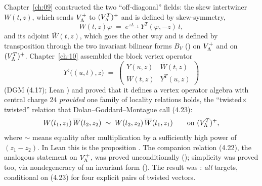 Chapter~\ref{ch:09} constructed the two ``off-diagonal'' fields: the skew intertwiner $W(t,z)$,
which sends $V_{\Lambda}^+$ to $(V_{\Lambda}^T)^+$ and is defined by skew-symmetry,
\begin{equation*}
  W(t,z)\varphi \;=\; e^{zL_{-1}}\,Y^{T}(\varphi,-z)\,t,
\end{equation*}
and its adjoint $\overline W(t,z)$, which goes the other way and is defined by transposition
through the two invariant bilinear forms $B_V$ () on $V_{\Lambda}^+$ and
 on $(V_{\Lambda}^T)^+$.  Chapter~\ref{ch:10} assembled the block vertex operator
\begin{equation}\label{ch14:eq:block}
  Y^{\natural}\bigl((u,t),z\bigr) \;=\;
  \begin{pmatrix} Y(u,z) & \overline W(t,z)\\ W(t,z) & Y^{T}(u,z)\end{pmatrix}
\end{equation}
(DGM (4.17); Lean ) and proved that it defines a vertex operator algebra with
central charge $24$ \emph{provided} one family of locality relations holds, the
``twisted$\times$twisted'' relation that Dolan--Goddard--Montague call (4.23):
\begin{equation}\label{ch14:eq:423}
  W(t_1,z_1)\,\overline W(t_2,z_2)\;\sim\;W(t_2,z_2)\,\overline W(t_1,z_1)
  \qquad\text{on }(V_{\Lambda}^{T})^{+},
\end{equation}
where $\sim$ means equality after multiplication by a sufficiently high power of $(z_1-z_2)$.
In Lean this is the proposition .  The companion relation
(4.22), the analogous statement on $V_{\Lambda}^+$, was proved unconditionally
(); simplicity was proved too, via nondegeneracy of an invariant form
().  The result was : \emph{all}
targets, conditional on (4.23) for four explicit pairs of twisted vectors.


